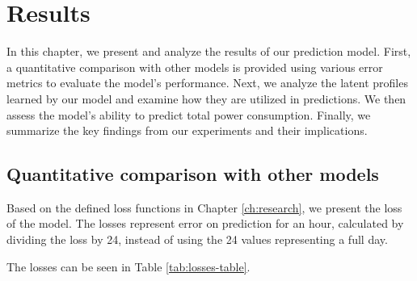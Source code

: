 \setchapterpreamble[u]{\margintoc}
\chapter{Results}
\label{ch:results}

In this chapter, we present and analyze the results of our prediction model. First, a quantitative comparison with other models is provided using various error metrics to evaluate the model's performance. Next, we analyze the latent profiles learned by our model and examine how they are utilized in predictions. We then assess the model's ability to predict total power consumption. Finally, we summarize the key findings from our experiments and their implications.


\section{Quantitative comparison with other models}
\label{sec:res-comparison}


Based on the defined loss functions in Chapter \ref{ch:research}, we present the loss of the model. The losses represent error on prediction for an hour, calculated by dividing the loss by 24, instead of using the 24 values representing a full day.


The losses can be seen in Table \ref{tab:losses-table}.

